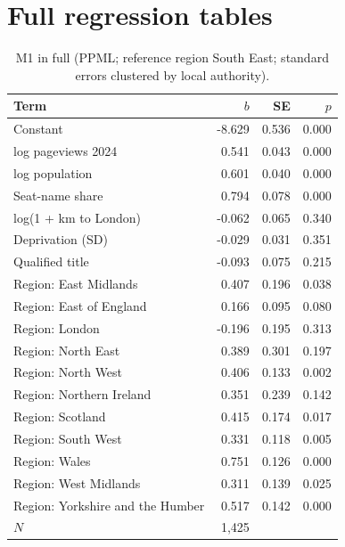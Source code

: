 \documentclass[11pt,a4paper]{article}
\begin{document}
\appendix
\section{Full regression tables}
\begin{table}[tbp]\centering\small\caption{M1 in full (PPML; reference region South East; standard errors clustered by local authority).}\label{tab:full}\begin{tabular}{lrrr}\toprule Term & $b$ & SE & $p$\\\midrule
Constant & -8.629 & 0.536 & 0.000\\
log pageviews 2024 & 0.541 & 0.043 & 0.000\\
log population & 0.601 & 0.040 & 0.000\\
Seat-name share & 0.794 & 0.078 & 0.000\\
log(1 + km to London) & -0.062 & 0.065 & 0.340\\
Deprivation (SD) & -0.029 & 0.031 & 0.351\\
Qualified title & -0.093 & 0.075 & 0.215\\
Region: East Midlands & 0.407 & 0.196 & 0.038\\
Region: East of England & 0.166 & 0.095 & 0.080\\
Region: London & -0.196 & 0.195 & 0.313\\
Region: North East & 0.389 & 0.301 & 0.197\\
Region: North West & 0.406 & 0.133 & 0.002\\
Region: Northern Ireland & 0.351 & 0.239 & 0.142\\
Region: Scotland & 0.415 & 0.174 & 0.017\\
Region: South West & 0.331 & 0.118 & 0.005\\
Region: Wales & 0.751 & 0.126 & 0.000\\
Region: West Midlands & 0.311 & 0.139 & 0.025\\
Region: Yorkshire and the Humber & 0.517 & 0.142 & 0.000\\
\midrule $N$ & 1,425 & & \\\bottomrule\end{tabular}\end{table}
\end{document}
